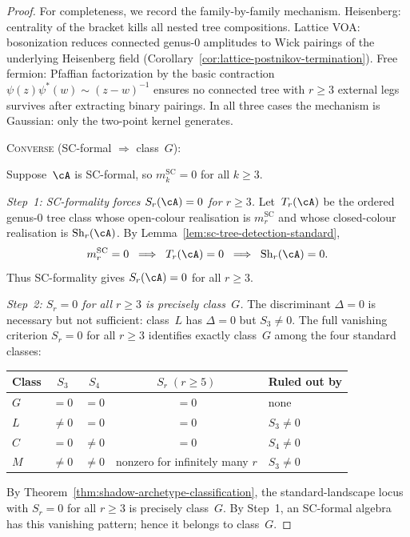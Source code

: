 \begin{proof}
For completeness, we record the family-by-family mechanism.
Heisenberg: centrality of the bracket kills all nested tree
compositions.
Lattice VOA: bosonization reduces connected genus-$0$ amplitudes
to Wick pairings of the underlying Heisenberg field
\textup{(}Corollary~\ref{cor:lattice-postnikov-termination}\textup{)}.
Free fermion: Pfaffian factorization by the basic contraction
$\psi(z)\psi^*(w) \sim (z{-}w)^{-1}$ ensures no connected tree
with $r \geq 3$ external legs survives after extracting binary
pairings. In all three cases the mechanism is Gaussian: only the
two-point kernel generates.

\medskip
\textsc{Converse} \textup{(}SC-formal $\Longrightarrow$ class~$G$\textup{)}:

\smallskip\noindent
Suppose~$\cA$ is SC-formal, so
$m_k^{\mathrm{SC}} = 0$ for all $k \geq 3$.

\emph{Step~1: SC-formality forces $S_r(\cA) = 0$ for $r \geq 3$.}
Let~$T_r(\cA)$ be the ordered genus-$0$ tree class whose
open-colour realisation is $m_r^{\mathrm{SC}}$ and whose
closed-colour realisation is $\operatorname{Sh}_r(\cA)$.
By Lemma~\ref{lem:sc-tree-detection-standard},
\begin{equation}
\label{eq:sc-formal-shadow-vanishing}
m_r^{\mathrm{SC}} = 0
\;\;\Longrightarrow\;\;
T_r(\cA)=0
\;\;\Longrightarrow\;\;
\operatorname{Sh}_r(\cA)=0 .
\end{equation}
Thus SC-formality gives $S_r(\cA)=0$ for all $r\geq3$.

\emph{Step~2: $S_r = 0$ for all $r \geq 3$ is precisely class~$G$.}
The discriminant $\Delta = 0$ is necessary but not sufficient:
class~$L$ has $\Delta = 0$ but $S_3 \neq 0$.
The full vanishing criterion $S_r = 0$ for all $r \geq 3$
identifies exactly class~$G$ among the four standard classes:
\begin{center}
\small
\renewcommand{\arraystretch}{1.15}
\begin{tabular}{@{}lcccl@{}}
\toprule
\textbf{Class} & $S_3$ & $S_4$ & $S_r\;(r \geq 5)$
& \textbf{Ruled out by} \\
\midrule
$G$ & $=0$ & $=0$ & $=0$ & none \\
$L$ & $\neq 0$ & $=0$ & $=0$ & $S_3 \neq 0$ \\
$C$ & $=0$ & $\neq 0$ & $=0$ & $S_4 \neq 0$ \\
$M$ & $\neq 0$ & $\neq 0$ & nonzero for infinitely many $r$ & $S_3 \neq 0$ \\
\bottomrule
\end{tabular}
\end{center}
By Theorem~\ref{thm:shadow-archetype-classification}, the
standard-landscape locus with $S_r = 0$ for all $r \geq 3$ is
precisely class~$G$. By Step~1, an SC-formal algebra has
this vanishing pattern; hence it belongs to class~$G$.
\end{proof}

